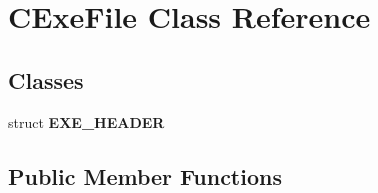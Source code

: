 \hypertarget{class_c_exe_file}{
\section{CExeFile Class Reference}
\label{class_c_exe_file}
}
\subsection*{Classes}
\begin{DoxyCompactItemize}
\item 
struct {\bfseries EXE\_\-HEADER}
\end{DoxyCompactItemize}
\subsection*{Public Member Functions}
